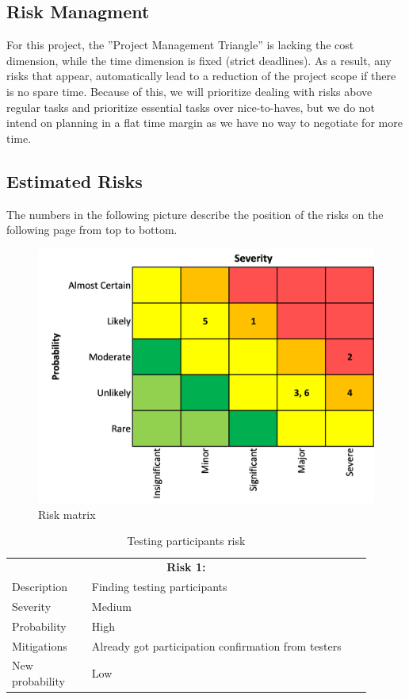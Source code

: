 \subsection{Risk Managment}
For this project, the ”Project Management Triangle” is lacking the cost dimension, while the time dimension is fixed (strict deadlines). As a result, any risks that appear, automatically lead to a reduction of the project scope if there is no spare time. Because of this, we will prioritize dealing with risks above regular tasks and prioritize essential tasks over nice-to-haves, but we do not intend on planning in a flat time margin as we have no way to negotiate for more time.

\subsection{Estimated Risks}
The numbers in the following picture describe the position of the risks on the following page from top to bottom.

\begin{figure}[H]
  \includegraphics[width=\linewidth]{resources/risks-matrix.png}
  \caption{Risk matrix}
  \label{risk_matrix}
\end{figure}

\begin{table}[H]
  \centering
  \begin{tabular}{|p{0.2\linewidth}p{0.7\linewidth}|}
    \hline
    \multicolumn{2}{|c|}{\textbf{Risk 1:}}                     \\
    Description     & Finding testing participants           \\
    Severity        & Medium                                 \\
    Probability     & High                                   \\
    Mitigations     & Already got participation confirmation from testers  \\
    New probability & Low                                    \\
    \hline                           
  \end{tabular}
  \caption{Testing participants risk}
\end{table}

